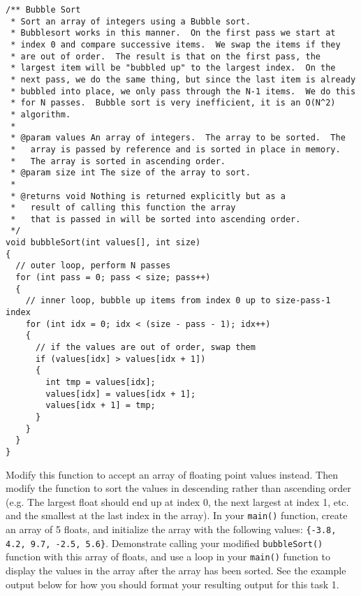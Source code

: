 \documentclass[11pt]{article}
\begin{document}
\begin{verbatim}
/** Bubble Sort
 * Sort an array of integers using a Bubble sort.
 * Bubblesort works in this manner.  On the first pass we start at
 * index 0 and compare successive items.  We swap the items if they
 * are out of order.  The result is that on the first pass, the
 * largest item will be "bubbled up" to the largest index.  On the
 * next pass, we do the same thing, but since the last item is already
 * bubbled into place, we only pass through the N-1 items.  We do this
 * for N passes.  Bubble sort is very inefficient, it is an O(N^2)
 * algorithm.
 *
 * @param values An array of integers.  The array to be sorted.  The
 *   array is passed by reference and is sorted in place in memory.
 *   The array is sorted in ascending order.
 * @param size int The size of the array to sort.
 *
 * @returns void Nothing is returned explicitly but as a
 *   result of calling this function the array
 *   that is passed in will be sorted into ascending order.
 */
void bubbleSort(int values[], int size)
{
  // outer loop, perform N passes
  for (int pass = 0; pass < size; pass++)
  {
    // inner loop, bubble up items from index 0 up to size-pass-1 index
    for (int idx = 0; idx < (size - pass - 1); idx++)
    {
      // if the values are out of order, swap them
      if (values[idx] > values[idx + 1])
      {
        int tmp = values[idx];
        values[idx] = values[idx + 1];
        values[idx + 1] = tmp;
      }
    }
  }
}
\end{verbatim}
   Modify this function to accept an array of floating point values
   instead.  Then modify the function to sort the values in descending
   rather than ascending order (e.g. The largest float should end up
   at index 0, the next largest at index 1, etc. and the smallest at
   the last index in the array).  In your \verb~main()~ function, create an
   array of 5 floats, and initialize the array with the following
   values: \verb~{-3.8, 4.2, 9.7, -2.5, 5.6}~.  Demonstrate calling your
   modified \verb~bubbleSort()~ function with this array of floats, and use
   a loop in your \verb~main()~ function to display the values in the array
   after the array has been sorted.  See the example output below for
   how you should format your resulting output for this task 1.
\end{document}
